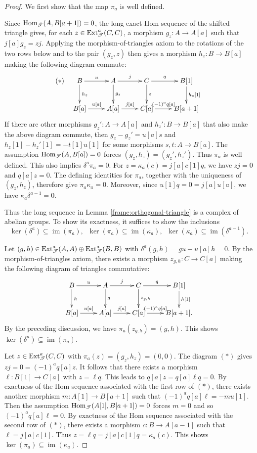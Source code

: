 \documentclass[11pt]{article}
\begin{document}
\begin{proof}
We first show that the map $\pi_a$ is well defined.

Since ${\rm Hom}_\mathscr{T}(A,B[a+1])=0$, the long exact Hom
sequence of the shifted triangle gives, for each
$z\in{\rm Ext}_{\mathscr T}^a(C,C)$, a morphism
$g_z:A\to A[a]$ such that $j[a]g_z=zj$.
Applying the morphism-of-triangles axiom to the rotations of
the two rows below and to the pair $(g_z,z)$ then gives a
morphism $h_z:B\to B[a]$ making the following diagram commute:
$$
(\ast)\quad
\xymatrix{
B\ar[r]^-{u}\ar[d]^-{h_z}& A\ar[r]^-{j}\ar[d]^-{g_z}&C\ar[r]^-{q}\ar[d]^-{z}& B[1]\ar[d]^-{h_z[1]}\\
B[a]\ar[r]^-{u[a]}& A[a]\ar[r]^-{j[a]}&C[a]\ar[r]^-{(-1)^aq[a]}& B[a+1]
}
$$
If there are other morphisms $g_z': A\to A[a]$ and $h_z':B\to B[a]$ that also make
the above diagram commute, then $g_z-g_z'=u[a]s$ and $h_z[1]-h_z'[1]=-t[1]u[1]$ for some morphisms
$s, t: A\to B[a]$. The assumption ${\rm Hom}_\mathscr{T}(A, B[a])=0$ forces $(g_z, h_z)=(g_z', h_z')$. Thus $\pi_a$ is well defined. This also implies $\delta^a\pi_a=0$. For $z=\kappa_a(c)=j[a]c[1]q$, we have $zj=0$ and $q[a]z=0$. The defining identities for $\pi_a$, together with the uniqueness of $(g_z,h_z)$, therefore give $\pi_a\kappa_a=0$. Moreover, since $u[1]q=0=j[a]u[a]$, we have $\kappa_a\delta^{a-1}=0$.

Thus the long sequence in Lemma \ref{frame:orthogonal-triangle} is a complex of abelian groups. To show its exactness, it suffices to show the inclusions
$$\ker(\delta^a)\subseteq \operatorname{im}(\pi_a),\;\; \ker(\pi_a)\subseteq\operatorname{im}(\kappa_a),\;\;
\ker(\kappa_a)\subseteq \operatorname{im}(\delta^{a-1}).$$

Let $(g,h)\in{\rm Ext}_{\mathscr T}^a(A,A)\oplus{\rm Ext}_{\mathscr T}^a(B,B)$ with $\delta^a(g,h)=gu-u[a]h=0$.
By the morphism-of-triangles axiom, there exists a morphism $z_{g,h}:C\to C[a]$ making the following diagram of triangles commutative:
$$
\xymatrix{
B\ar[r]^-{u}\ar[d]^-{h}& A\ar[r]^-{j}\ar[d]^-{g}&C\ar[r]^-{q}\ar[d]^-{z_{g,h}}& B[1]\ar[d]^-{h[1]}\\
B[a]\ar[r]^-{u[a]}& A[a]\ar[r]^-{j[a]}&C[a]\ar[r]^-{(-1)^aq[a]}& B[a+1].
}
$$
By the preceding discussion, we have $\pi_a(z_{g,h})=(g,h)$. This shows $\ker(\delta^a)\subseteq \operatorname{im}(\pi_a)$.

Let $z\in {\rm Ext}_{\mathscr T}^a(C,C)$ with $\pi_a(z)=(g_z, h_z)=(0,0)$. The diagram $(\ast)$ gives
$zj=0=(-1)^aq[a]z$. It follows that there exists a morphism $\ell: B[1]\to C[a]$ with $z=\ell q$.
This leads to $q[a]z=q[a]\ell q=0$. By exactness of the Hom sequence associated with the first row of $(\ast)$, there exists another morphism $m:A[1]\to B[a+1]$ such that $(-1)^aq[a]\ell=-mu[1]$. Then the assumption ${\rm Hom}_\mathscr{T}(A[1], B[a+1])=0$ forces $m=0$ and so $(-1)^aq[a]\ell=0$. By exactness of the Hom sequence associated with the second row of $(\ast)$,
there exists a morphism $c: B\to A[a-1]$ such that $\ell=j[a]c[1]$. Thus $z=\ell q=j[a]c[1]q=\kappa_a(c)$.
This shows $\ker(\pi_a)\subseteq\operatorname{im}(\kappa_a)$.


\end{proof}
\end{document}
